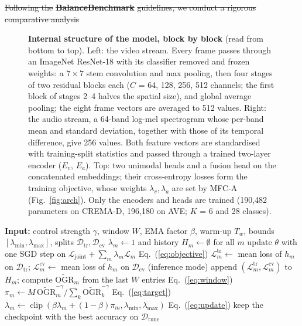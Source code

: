 \documentclass[fleqn,10pt]{wlscirep}
\newcommand{\Ltr}{\mathcal{L}^{\mathrm{tr}}} %
\newcommand{\Lcv}{\mathcal{L}^{\mathrm{cv}}} %
\newcommand{\OGR}{\mathrm{OGR}} %
\providecommand{\DIFdel}[1]{{\protect\color{red}\sout{#1}}} %
\providecommand{\DIFaddbegin}{} %
\providecommand{\DIFdelbegin}{} %
\providecommand{\DIFdelend}{} %
\begin{document}
\DIFdelbegin \DIFdel{Following the }\textbf{\DIFdel{BalanceBenchmark}} %
\DIFdel{guidelines, we conduct a rigorous comparative analysis}\DIFdelend \DIFaddbegin \begin{figure}[p]
\centering
\resizebox*{!}{0.84\textheight}{}
\caption{\textbf{Internal structure of the model, block by block} (read from bottom to top). Left: the video stream. Every frame passes through an ImageNet ResNet-18 with its classifier removed and frozen weights: a $7{\times}7$ stem convolution and max pooling, then four stages of two residual blocks each ($C$ = 64, 128, 256, 512 channels; the first block of stages 2--4 halves the spatial size), and global average pooling; the eight frame vectors are averaged to 512 values. Right: the audio stream, a 64-band log-mel spectrogram whose per-band mean and standard deviation, together with those of its temporal difference, give 256 values. Both feature vectors are standardised with training-split statistics and passed through a trained two-layer encoder ($E_v$, $E_a$). Top: two unimodal heads and a fusion head on the concatenated embeddings; their cross-entropy losses form the training objective, whose weights $\lambda_v,\lambda_a$ are set by MFC-A (Fig.~\ref{fig:arch}). Only the encoders and heads are trained (190,482 parameters on CREMA-D, 196,180 on AVE; $K$ = 6 and 28 classes).}
\label{fig:archdetail}
\end{figure}

\begin{algorithm}[t]
\caption{MFC-A (the method evaluated in all main experiments)}
\label{alg:mfca}
\begin{algorithmic}[1]
\STATE \textbf{Input:} control strength $\gamma$, window $W$, EMA factor $\beta$, warm-up $T_w$, bounds $[\lambda_{\min},\lambda_{\max}]$, splits $\mathcal{D}_{\mathrm{tr}},\mathcal{D}_{\mathrm{cv}}$
\STATE $\lambda_m\leftarrow1$ and history $H_m\leftarrow\emptyset$ for all $m$
    \STATE update $\theta$ with one SGD step on $\mathcal{L}_{\mathrm{joint}}+\sum_m\lambda_m\mathcal{L}_m$ \hfill Eq.~(\ref{eq:objective})
  \ENDFOR
    \STATE $\Ltr_m\leftarrow$ mean loss of $h_m$ on $\mathcal{D}_{\mathrm{tr}}$; \; $\Lcv_m\leftarrow$ mean loss of $h_m$ on $\mathcal{D}_{\mathrm{cv}}$ \hfill (inference mode)
    \STATE append $(\Ltr_m,\Lcv_m)$ to $H_m$; \; compute $\widetilde{\OGR}_m$ from the last $W$ entries \hfill Eq.~(\ref{eq:window})
  \ENDFOR
      \STATE $\pi_m\leftarrow M\,\widetilde{\OGR}_m^{-\gamma}/\sum_k\widetilde{\OGR}_k^{-\gamma}$ \hfill Eq.~(\ref{eq:target})
      \STATE $\lambda_m\leftarrow\operatorname{clip}(\beta\lambda_m+(1-\beta)\pi_m,\lambda_{\min},\lambda_{\max})$ \hfill Eq.~(\ref{eq:update})
    \ENDFOR
  \ENDIF
  \STATE keep the checkpoint with the best accuracy on $\mathcal{D}_{\mathrm{tune}}$
\ENDFOR
\end{algorithmic}
\end{algorithm}
\end{document}
